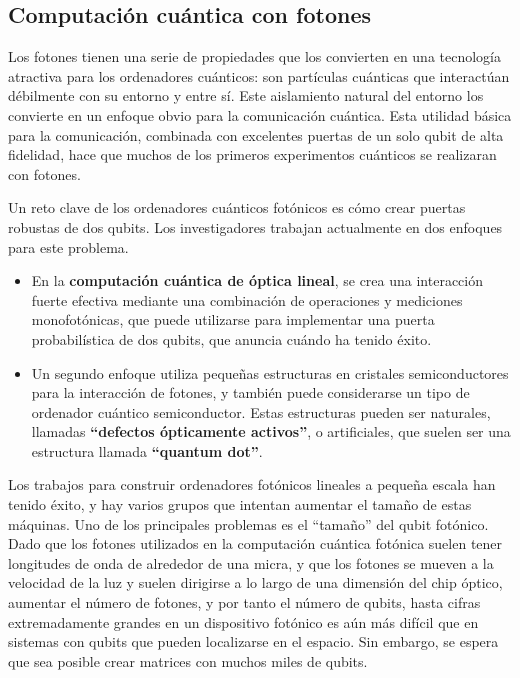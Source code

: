	\subsection{Computación cuántica con fotones}

Los fotones tienen una serie de propiedades que los convierten en una tecnología atractiva para los ordenadores cuánticos: son partículas cuánticas que interactúan débilmente con su entorno y entre sí. Este aislamiento natural del entorno los convierte en un enfoque obvio para la comunicación cuántica. Esta utilidad básica para la comunicación, combinada con excelentes puertas de un solo qubit de alta fidelidad, hace que muchos de los primeros experimentos cuánticos se realizaran con fotones. 

Un reto clave de los ordenadores cuánticos fotónicos es cómo crear puertas robustas de dos qubits. Los investigadores trabajan actualmente en dos enfoques para este problema. 
\begin{itemize}
\item En la \textbf{computación cuántica de óptica lineal}, se crea una interacción fuerte efectiva mediante una combinación de operaciones y mediciones monofotónicas, que puede utilizarse para implementar una puerta probabilística de dos qubits, que anuncia cuándo ha tenido éxito. 
\item Un segundo enfoque utiliza pequeñas estructuras en cristales semiconductores para la interacción de fotones, y también puede considerarse un tipo de ordenador cuántico semiconductor. Estas estructuras pueden ser naturales, llamadas \textbf{``defectos ópticamente activos''}, o artificiales, que suelen ser una estructura llamada \textbf{``quantum dot''}.
\end{itemize}

Los trabajos para construir ordenadores fotónicos lineales a pequeña escala han tenido éxito, y hay varios grupos que intentan aumentar el tamaño de estas máquinas. Uno de los principales problemas es el ``tamaño'' del qubit fotónico. Dado que los fotones utilizados en la computación cuántica fotónica suelen tener longitudes de onda de alrededor de una micra, y que los fotones se mueven a la velocidad de la luz y suelen dirigirse a lo largo de una dimensión del chip óptico, aumentar el número de fotones, y por tanto el número de qubits, hasta cifras extremadamente grandes en un dispositivo fotónico es aún más difícil que en sistemas con qubits que pueden localizarse en el espacio. Sin embargo, se espera que sea posible crear matrices con muchos miles de qubits. 

